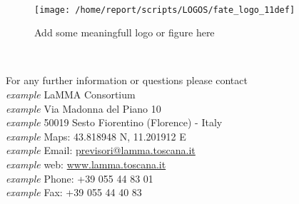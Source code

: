 
\clearpage
\begin{center}
\HRule \\[0.4cm]
\begin{figure}[htbp]
\centering
{\texttt{[image: /home/report/scripts/LOGOS/fate\_logo\_11def]}}
\caption{Add some meaningfull logo or figure here}
\end{figure}
\HRule \\[0.4cm]
\end{center}

\vspace{5.55cm}
\begin{flushright}
\large{For any further information or questions please contact
\\\textit{example} LaMMA Consortium
\\\textit{example} Via Madonna del Piano 10
\\\textit{example} 50019 Sesto Fiorentino (Florence) - Italy
\\\textit{example} Maps: 43.818948 N, 11.201912 E
\\\textit{example} Email: \href{mailto:previsori@lamma.toscana.it}{previsori@lamma.toscana.it}
\\\textit{example} web: \href{www.lamma.toscana.it}{www.lamma.toscana.it}
\\\textit{example} Phone: +39 055 44 83 01
\\\textit{example} Fax: +39 055 44 40 83}
\end{flushright}




